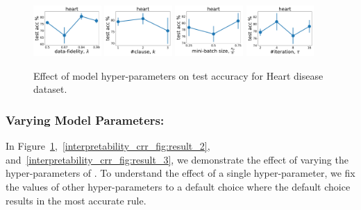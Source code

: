 \begin{figure}[t]
	\centering
	\subfloat
	{\includegraphics[width=0.23\textwidth]{figures/interpretability/relaxed-cnf/heart_test_accuracy_vary_lambda.pdf}\label{interpretability_crr_fig:d}} \hfill
	\subfloat
	{\includegraphics[width=0.23\textwidth]{figures/interpretability/relaxed-cnf/heart_test_accuracy_vary_clause.pdf}\label{interpretability_crr_fig:f}} \hfill
	\subfloat
	{\includegraphics[width=0.23\textwidth]{figures/interpretability/relaxed-cnf/heart_test_accuracy_vary_subsamplesize.pdf}
		\label{interpretability_crr_fig:a}} \hfill
	\subfloat
	{\includegraphics[width=0.23\textwidth]{figures/interpretability/relaxed-cnf/heart_test_accuracy_vary_iteration.pdf}\label{interpretability_crr_fig:g}} \hfill
	\caption{Effect of model hyper-parameters on test accuracy  for  Heart disease dataset. } 
	\label{interpretability_crr_fig:result_1}
\end{figure}
	

	\subsubsection*{Varying Model Parameters: }
	\label{interpretability_crr_sec:model_parameters}
	In Figure~\ref{interpretability_crr_fig:result_1},~\ref{interpretability_crr_fig:result_2}, and~\ref{interpretability_crr_fig:result_3}, we demonstrate the effect of varying the hyper-parameters of {\crr}. To understand the effect of a single hyper-parameter, we fix the values of other hyper-parameters to a default choice where the default choice results in the most accurate rule. 
	 

